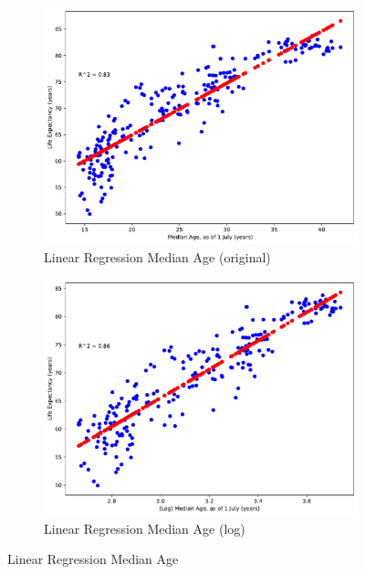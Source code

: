 \documentclass[a4paper]{article}
\begin{document}
\begin{figure}
  \centering
  \begin{subfigure}[a]{\textwidth}
      \centering
      \includegraphics[width=\textwidth]{ola/_linear_regression_median_age,_as_of_1_july_(years).pdf}
      \caption{Linear Regression Median Age (original)}
      \label{fig:reg_median_age}
  \end{subfigure}
  \vfill
  \begin{subfigure}[b]{\textwidth}
      \centering
      \includegraphics[width=\textwidth]{ola/[log]_linear_regression_median_age,_as_of_1_july_(years).pdf}
      \caption{Linear Regression Median Age (log)}
      \label{fig:reg_median_age_log}
  \end{subfigure}
  \caption{Linear Regression Median Age}
  \label{fig:linear_regression_median_age}
\end{figure}
\end{document}
